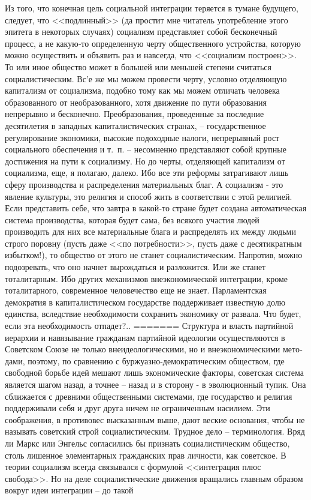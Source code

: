 \documentclass{book}
\begin{document}
Из того, что конечная цель социальной интеграции теряется в тумане будущего, следует, что <<подлинный>> (да простит мне читатель употребление этого эпитета в некоторых случаях) социализм представляет собой бесконечный процесс, а не какую‑то определенную черту общественного устройства, которую можно осуществить и объявить раз и навсегда, что <<социализм построен>>. То или иное общество может в большей или мень­шей степени считаться социалистическим. Вс'е же мы можем провести черту, условно отделяющую капитализм от социализ­ма, подобно тому как мы можем отличать человека образо­ванного от необразованного, хотя движение по пути образо­вания непрерывно и бесконечно. Преобразования, проведенные за последние десятилетия в западных капиталистических стра­нах, -- государственное регулирование экономики, высокие по­доходные налоги, непрерывный рост социального обеспечения и т.~п. -- несомненно представляют собой крупные достижения на пути к социализму. Но до черты, отделяющей капитализм от социализма, еще, я полагаю, далеко. Ибо все эти реформы за­трагивают лишь сферу производства и распределения матери­альных благ. А социализм ‑ это явление культуры, это религия и способ жить в соответствии с этой религией. Если предста­вить себе, что завтра в какой‑то стране будет создана автомати­ческая система производства, которая будет сама, без всякого участия людей  производить для них все материальные блага и распределять их между людьми строго поровну (пусть даже <<по потребности>>, пусть даже с десятикратным избытком!), то общество от этого не станет социалистическим. Напротив, можно подозревать, что оно начнет вырождаться и разложится. Или же станет тоталитарным. Ибо других механизмов внеэконо­мической интеграции, кроме тоталитарного, современное чело­вечество еще не знает. Парламентская демократия в капитали­стическом государстве поддерживает известную долю единства, вследствие необходимости сохранить экономику от развала. Что будет, если эта необходимость отпадет?..
=======
Структура и власть партийной иерархии и навязывание граж­данам партийной идеологии осуществляются в Советском Союзе не только внеидеологическими, но и внеэкономическими мето­дами, поэтому, по сравнению с буржуазно-демократическим обществом, где свободной борьбе идей мешают лишь экономи­ческие факторы, советская система является шагом назад, а точнее -- назад и в сторону - в эволюционный тупик. Она сбли­жается с древними общественными системами, где государст­во и религия поддерживали себя и друг друга ничем не огра­ниченным насилием. Эти соображения, в противовес высказан­ным выше, дают веские основания, чтобы не называть совет­ский строй социалистическим. Трудное дело -- терминология. Вряд ли Маркс или Энгельс согласились бы признать социали­стическим общество, столь лишенное элементарных граждан­ских прав личности, как советское. В теории социализм всегда связывался с формулой <<интеграция плюс свобода>>. Но на де­ле социалистические движения вращались главным образом вокруг идеи интеграции -- до такой 
\end{document}
